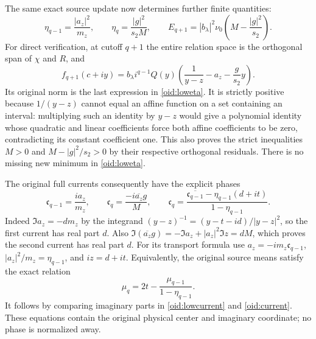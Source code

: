 \documentclass[11pt,a4paper]{article}
\begin{document}
The same exact source update now determines further finite quantities:
\begin{equation}\label{oid:loweta}
 \boxed{\eta_{q-1}=\frac{|a_z|^2}{m_z},\qquad
 \eta_q=\frac{|g|^2}{s_2M},\qquad
 E_{q+1}=|b_\lambda|^2\nu_0
 \left(M-\frac{|g|^2}{s_2}\right).}
\end{equation}
For direct verification, at cutoff $q+1$ the entire relation space
is the orthogonal span of $\chi$ and $R$, and
\[
 f_{q+1}(c+iy)=b_\lambda i^{q-1}Q(y)
 \left(\frac1{y-z}-a_z-\frac{g}{s_2}y\right).
\]
Its original norm is the last expression in \eqref{oid:loweta}.
It is strictly positive because $1/(y-z)$ cannot equal an affine
function on a set containing an interval: multiplying such an
identity by $y-z$ would give a polynomial identity whose quadratic
and linear coefficients force both affine coefficients to be zero,
contradicting its constant coefficient one. This also proves the
strict inequalities $M>0$ and $M-|g|^2/s_2>0$ by their respective
orthogonal residuals. There is no missing new minimum in
\eqref{oid:loweta}.

The original full currents consequently have the explicit phases
\begin{equation}\label{oid:lowcurrent}
 \mathfrak c_{q-1}=\frac{i a_z}{m_z},\qquad
 \mathfrak c_q=\frac{-i\overline{a_z}g}{M},\qquad
 \boxed{\mathfrak c_q=
 \frac{\overline{\mathfrak c_{q-1}}
 -\eta_{q-1}(d+it)}{1-\eta_{q-1}}.}
\end{equation}
Indeed $\Im a_z=-dm_z$ by the integrand
$(y-z)^{-1}=(y-t-id)/|y-z|^2$, so the first current has real
part $d$. Also
$\Im(\overline{a_z}g)=-\Im a_z+|a_z|^2\Im z=dM$,
which proves the second current has real part $d$.
For its transport formula use
$a_z=-im_z\mathfrak c_{q-1}$,
$|a_z|^2/m_z=\eta_{q-1}$, and $iz=d+it$.
Equivalently, the original source means satisfy the exact relation
\begin{equation}\label{oid:lowmean}
 \mu_q=2t-\frac{\mu_{q-1}}{1-\eta_{q-1}}.
\end{equation}
It follows by comparing imaginary parts in \eqref{oid:lowcurrent}
and \eqref{oid:current}. These equations contain the original
physical center and imaginary coordinate; no phase is normalized away.
\end{document}
